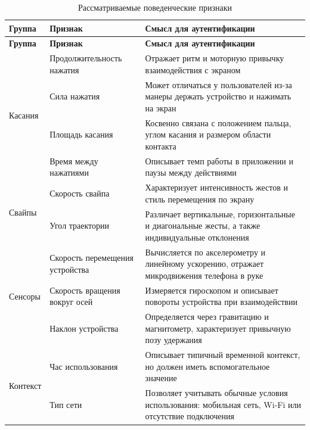 \documentclass[oneside,senior,etd]{BYUPhys}
\begin{document}
\begin{longtable}{|p{}|p{}|p{}|}
	\caption{Рассматриваемые поведенческие признаки}\label{tab:features-detailed}\\
	\hline
	\textbf{Группа} & \textbf{Признак} & \textbf{Смысл для аутентификации} \\
	\hline
	\endfirsthead
	
	\hline
	\textbf{Группа} & \textbf{Признак} & \textbf{Смысл для аутентификации} \\
	\hline
	\endhead
	
	\multirow{4}{0.2\textwidth}{Касания}
	& Продолжительность нажатия
	& Отражает ритм и моторную привычку взаимодействия с экраном \\
	\cline{2-3}
	& Сила нажатия
	& Может отличаться у пользователей из-за манеры держать устройство и нажимать на экран \\
	\cline{2-3}
	& Площадь касания
	& Косвенно связана с положением пальца, углом касания и размером области контакта \\
	\cline{2-3}
	& Время между нажатиями
	& Описывает темп работы в приложении и паузы между действиями \\
	\hline
	
	\multirow{2}{0.2\textwidth}{Свайпы}
	& Скорость свайпа
	& Характеризует интенсивность жестов и стиль перемещения по экрану \\
	\cline{2-3}
	& Угол траектории
	& Различает вертикальные, горизонтальные и диагональные жесты, а также индивидуальные отклонения \\
	\hline
	
	\multirow{3}{0.2\textwidth}{Сенсоры}
	& Скорость перемещения устройства
	& Вычисляется по акселерометру и линейному ускорению, отражает микродвижения телефона в руке \\
	\cline{2-3}
	& Скорость вращения вокруг осей
	& Измеряется гироскопом и описывает повороты устройства при взаимодействии \\
	\cline{2-3}
	& Наклон устройства
	& Определяется через гравитацию и магнитометр, характеризует привычную позу удержания \\
	\hline
	
	\multirow{2}{0.2\textwidth}{Контекст}
	& Час использования
	& Описывает типичный временной контекст, но должен иметь вспомогательное значение \\
	\cline{2-3}
	& Тип сети
	& Позволяет учитывать обычные условия использования: мобильная сеть, Wi-Fi или отсутствие подключения \\
	\hline
	
\end{longtable}
\end{document}

